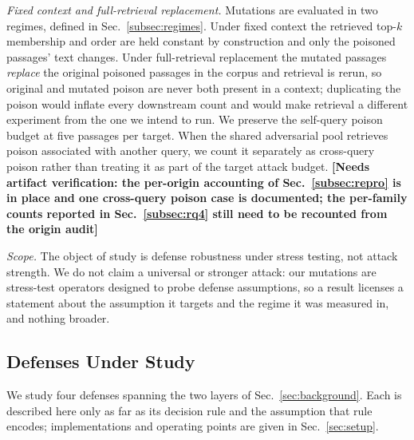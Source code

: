 \documentclass[conference]{IEEEtran}
\newcommand{\VERIFY}[1]{\textbf{[Needs artifact verification: #1]}}
\begin{document}
\textit{Fixed context and full-retrieval replacement.} Mutations are evaluated
in two regimes, defined in Sec.~\ref{subsec:regimes}. Under fixed context the
retrieved top-$k$ membership and order are held constant by construction and
only the poisoned passages' text changes. Under full-retrieval replacement the
mutated passages \emph{replace} the original poisoned passages in the corpus and
retrieval is rerun, so original and mutated poison are never both present in a
context; duplicating the poison would inflate every downstream count and would
make retrieval a different experiment from the one we intend to run. We preserve
the self-query poison budget at five passages per target. When the shared
adversarial pool retrieves poison associated with another query, we count it
separately as cross-query poison rather than treating it as part of the target
attack budget.
\VERIFY{the per-origin accounting of Sec.~\ref{subsec:repro} is in place and one
cross-query poison case is documented; the per-family counts reported in
Sec.~\ref{subsec:rq4} still need to be recounted from the origin audit}

\textit{Scope.} The object of study is defense robustness under stress testing,
not attack strength. We do not claim a universal or stronger attack: our
mutations are stress-test operators designed to probe defense assumptions, so a
result licenses a statement about the assumption it targets and the regime it
was measured in, and nothing broader.

\subsection{Defenses Under Study}
\label{subsec:families}
We study four defenses spanning the two layers of Sec.~\ref{sec:background}.
Each is described here only as far as its decision rule and the assumption that
rule encodes; implementations and operating points are given in
Sec.~\ref{sec:setup}.
\end{document}
